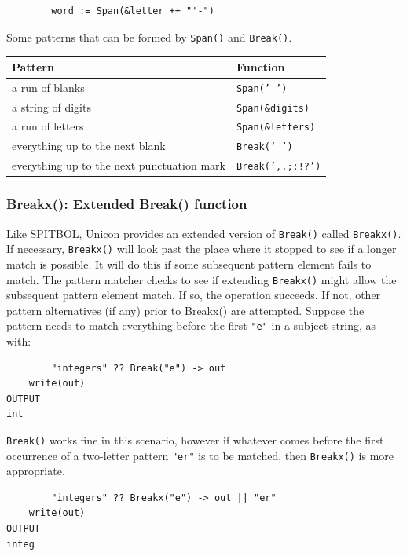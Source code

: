 \documentclass[letterpaper,12pt]{article}
\begin{document}
\begin{verbatim}
        word := Span(&letter ++ "'-")
\end{verbatim}

Some patterns that can be formed by {\tt Span()} and {\tt Break()}.
\begin{table}[h]
\begin{center}
{\begin{tabular}{ | l | l | } \hline 
        Pattern & Function \\ \hline
        a run of blanks & {\tt Span(' ')} \\ \hline
	a string of digits & {\tt Span(\&digits)} \\ \hline
	a run of letters & {\tt Span(\&letters)} \\ \hline
	everything up to the next blank & {\tt Break(' ')} \\ \hline
	everything up to the next punctuation mark & {\tt Break(',.;:!?')} \\ \hline
\end{tabular}}
\end{center}
\end{table}

\subsubsection{Breakx(): Extended Break() function}

Like SPITBOL, Unicon provides an extended version of \texttt{Break()} called
\texttt{Breakx()}. If necessary, {\tt Breakx()} will look past the
place where it
stopped to see if a longer match is possible. It will do this if some
subsequent pattern element fails to match. The pattern matcher checks
to see if extending {\tt Breakx()} might allow the subsequent pattern
element match. If so, the operation succeeds. If not, other pattern
alternatives (if any) prior to Breakx() are attempted.  Suppose the
pattern needs to match everything before the first \texttt{"e"} in a
subject string, as with:

\begin{verbatim}
        "integers" ?? Break("e") -> out
	write(out)
OUTPUT
int
\end{verbatim}

{\tt Break()} works fine in this scenario, however if whatever comes before
the first occurrence of a two-letter pattern {\tt "er"} is to be matched,
then {\tt Breakx()} is more appropriate.

\begin{verbatim}
        "integers" ?? Breakx("e") -> out || "er"
	write(out)
OUTPUT
integ
\end{verbatim}
\end{document}
